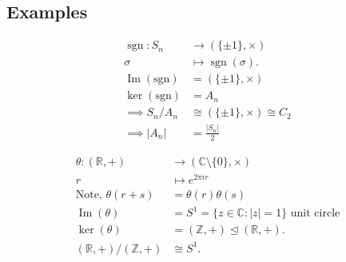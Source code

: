 \hypertarget{examples}{%
\subsection{Examples}\label{examples}}

\begin{example}
\begin{align*}
    \operatorname{sgn} : S_n &\to ( \{ \pm 1 \}, \times) \\
    \sigma &\mapsto \operatorname{sgn}(\sigma). \\
    \operatorname{Im}(\text{sgn}) &= ( \{ \pm 1 \}, \times) \\
    \ker(\text{sgn}) &= A_n \\
    \implies S_n / A_n &\cong ( \{ \pm 1 \}, \times) \cong C_2 \\
    \implies |A_n| &= \frac{|S_n|}{2}
\end{align*}
\end{example}

\begin{example}
\begin{align*}
    \theta : (\mathbb{R}, +) &\to (\mathbb{C} \setminus \{ 0 \}, \times) \\
    r &\mapsto e^{2 \pi i r} \\
    \text{Note, } \theta(r + s) &= \theta(r) \theta(s) \\
    \operatorname{Im}(\theta) &= S^1 = \{ z \in \mathbb{C} : |z| = 1 \} \text{ unit circle} \\
    \ker (\theta) &= (\mathbb{Z}, +) \trianglelefteq  (\mathbb{R}, +) . \\
    (\mathbb{R}, +) / (\mathbb{Z}, +) &\cong S^1.
\end{align*}
\end{example}


